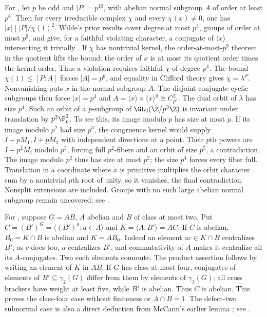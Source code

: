 For , let \(p\) be odd and \(|P|=p^{10}\), with
abelian normal subgroup \(A\) of order at least \(p^6\).
Then for every irreducible complex \(\chi\) and every
\(\chi(x)\ne0\), one has \(|x|\mid |P|/\chi(1)^2\).
Wilde's prior results cover degree at most \(p^3\), groups
of order at most \(p^9\), and give, for a faithful violating
character, a conjugate of \(\langle x\rangle\) intersecting it
trivially \cite{wilde-supports}.
If \(\chi\) has nontrivial kernel, the order-at-most-\(p^9\)
theorem in the quotient lifts the bound: the order of \(x\)
is at most its quotient order times the kernel order.
Thus a violation requires faithful \(\chi\) of degree \(p^4\).
The bound \(\chi(1)\le[P:A]\) forces \(|A|=p^6\),
and equality in Clifford theory gives \(\chi=\lambda^P\).
Nonvanishing puts \(x\) in the normal subgroup \(A\).
The disjoint conjugate cyclic subgroups then force \(|x|=p^3\)
and \(A=\langle x\rangle\times\langle x\rangle^g
\cong C_{p^3}^2\). The dual orbit of \(\lambda\) has size \(p^4\).
Such an orbit of a \(p\)-subgroup of
\(\GL_2(\Z/p^3\Z)\) is invariant under translation by \(p^2\F_p^2\).
To see this, its image modulo \(p\) has size at most \(p\).
If its image modulo \(p^2\) had size \(p^3\), the congruence
kernel would supply \(I+pM_1,I+pM_2\) with independent
directions at a point. Their \(p\)th powers are
\(I+p^2M_i\) modulo \(p^3\), forcing full \(p^2\)-fibers and
an orbit of size \(p^5\), a contradiction. The image modulo
\(p^2\) thus has size at most \(p^2\); the size \(p^4\)
forces every fiber full. Translation in a coordinate where
\(x\) is primitive multiplies the orbit character sum by a
nontrivial \(p\)th root of unity, so it vanishes, the final
contradiction. Nonsplit extensions are included.
Groups with no such large abelian normal subgroup remain
uncovered; see .

For , suppose \(G=AB\), \(A\) abelian and \(B\)
of class at most two. Put \(C=(B')^G=\langle(B')^a:a\in A\rangle\)
and \(K=\langle A,B'\rangle=AC\).
If \(C\) is abelian, \(B_0=K\cap B\) is abelian and \(K=AB_0\).
Indeed an element \(ac\in K\cap B\) centralizes \(B'\);
as \(c\) does too, \(a\) centralizes \(B'\), and commutativity
of \(A\) makes it centralize all its \(A\)-conjugates.
Two such elements commute. The product assertion follows
by writing an element of \(K\) in \(AB\).
If \(G\) has class at most four, conjugates of elements of
\(B'\subseteq\gamma_2(G)\) differ from them by elements
of \(\gamma_3(G)\); all cross brackets have weight at least
five, while \(B'\) is abelian. Thus \(C\) is abelian.
This proves the class-four case without finiteness or
\(A\cap B=1\). The defect-two subnormal case is also a direct
deduction from McCann's earlier lemma \cite{mccann};
see .

